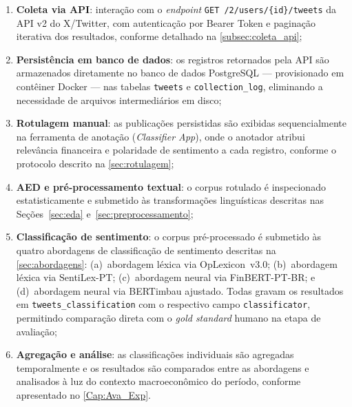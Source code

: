 \begin{enumerate}
	\item \textbf{Coleta via API}: interação com o \textit{endpoint} \texttt{GET /2/users/\{id\}/tweets} da API v2 do X/Twitter, com autenticação por Bearer Token e paginação iterativa dos resultados, conforme detalhado na \autoref{subsec:coleta_api};
	
	\item \textbf{Persistência em banco de dados}: os registros retornados pela API são armazenados diretamente no banco de dados PostgreSQL — provisionado em contêiner Docker — nas tabelas
	\texttt{tweets} e \texttt{collection\_log}, eliminando a necessidade de arquivos intermediários em disco;
	
	\item \textbf{Rotulagem manual}: as publicações persistidas são exibidas sequencialmente na ferramenta de anotação (\textit{Classifier App}), onde o anotador atribui relevância financeira e polaridade de sentimento a cada registro, conforme o protocolo descrito na \autoref{sec:rotulagem};
	
	\item \textbf{AED e pré-processamento textual}: o corpus rotulado é inspecionado estatisticamente e submetido às transformações linguísticas descritas nas Seções~\ref{sec:eda} 	e~\ref{sec:preprocessamento};
	
	\item \textbf{Classificação de sentimento}: o corpus pré-processado é submetido às quatro abordagens de classificação de sentimento descritas na \autoref{sec:abordagens}: (a)~abordagem léxica via OpLexicon~v3.0; (b)~abordagem léxica via SentiLex-PT; (c)~abordagem neural via FinBERT-PT-BR; e (d)~abordagem neural via BERTimbau ajustado. Todas gravam os resultados em \texttt{tweets\_classification} com o respectivo campo \texttt{classificator}, permitindo comparação direta com o \textit{gold standard} humano na etapa de avaliação;

	\item \textbf{Agregação e análise}: as classificações individuais são agregadas temporalmente e os resultados são comparados entre as abordagens e analisados à luz do contexto macroeconômico do período, conforme apresentado no \autoref{Cap:Ava_Exp}.
\end{enumerate}

